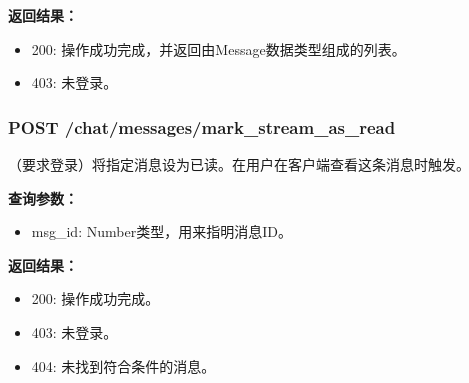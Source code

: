 \textbf{返回结果：}
    \begin{itemize}
    \item 200: 操作成功完成，并返回由Message数据类型组成的列表。
    \item 403: 未登录。
    \end{itemize}

\subsubsection{\textbf{POST} /chat/messages/mark\_stream\_as\_read}
（要求登录）将指定消息设为已读。在用户在客户端查看这条消息时触发。

\textbf{查询参数：}
    \begin{itemize}
        \item msg\_id: Number类型，用来指明消息ID。
    \end{itemize}

\textbf{返回结果：}
    \begin{itemize}
    \item 200: 操作成功完成。
    \item 403: 未登录。
    \item 404: 未找到符合条件的消息。
    \end{itemize}

